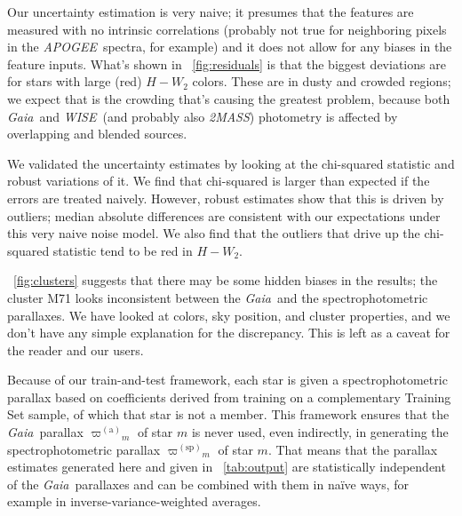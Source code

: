 \documentclass[modern]{aastex62}
\newcommand{\acronym}[1]{{\small{#1}}}
\newcommand{\project}[1]{\textsl{#1}}
\newcommand{\apogee}{\project{\acronym{APOGEE}}}
\newcommand{\gaia}{\project{Gaia}}
\newcommand{\wise}{\project{\acronym{WISE}}}
\newcommand{\zmass}{\project{\acronym{2MASS}}}
\newcommand{\gparallax}{{\varpi^{(\mathrm{a})}}}
\newcommand{\sparallax}{{\varpi^{(\mathrm{sp})}}}
\begin{document}
Our uncertainty estimation is very naive; it presumes that the features are measured
with no intrinsic correlations (probably not true for neighboring pixels in the \apogee\ spectra,
for example) and it does not allow for any biases in the feature inputs.
What's shown in \figurename~\ref{fig:residuals} is that the biggest deviations are for
stars with large (red) $H-W_2$ colors.
These are in dusty and crowded regions; we expect that is the crowding that's causing the
greatest problem, because both \gaia\ and \wise\ (and probably also \zmass) photometry is
affected by overlapping and blended sources.

We validated the uncertainty estimates by looking at the chi-squared statistic and robust
variations of it.
We find that chi-squared is larger than expected if the errors are treated naively.
However, robust estimates show that this is driven by outliers;
median absolute differences are consistent with our expectations under this very naive noise model.
We also find that the outliers that drive up the chi-squared statistic tend to be red
in $H-W_2$.

\figurename~\ref{fig:clusters} suggests that there may be some hidden biases in
the results; the cluster M71 looks inconsistent between the \gaia\ and the spectrophotometric
parallaxes.
We have looked at colors, sky position, and cluster properties, and we don't have any
simple explanation for the discrepancy.
This is left as a caveat for the reader and our users.

Because of our train-and-test framework, each star is given a spectrophotometric
parallax based on coefficients derived from training on a complementary Training Set sample, of
which that star is not a member.
This framework ensures that the \gaia\ parallax $\gparallax_m$ of star $m$ is never used,
even indirectly, in generating the spectrophotometric parallax $\sparallax_m$ of star $m$.
That means that the parallax estimates generated here and given in \tablename~\ref{tab:output}
are statistically independent of the \gaia\ parallaxes and can be combined with them in
na\"ive ways, for example in inverse-variance-weighted averages.
\end{document}
